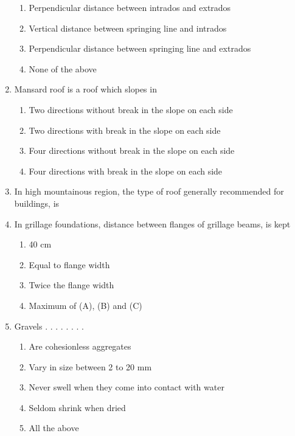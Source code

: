 \documentclass[11pt,a4paper]{article}
\begin{document}
\begin{enumerate}
\begin{enumerate}[label=\Alph*.]
\item{Perpendicular distance between intrados and extrados}
\item{Vertical distance between springing line and intrados}
\item{Perpendicular distance between springing line and extrados}
\item{None of the above}
\end{enumerate}
\item{Mansard roof is a roof which slopes in}
\begin{enumerate}[label=\Alph*.]
\item{Two directions without break in the slope on each side}
\item{Two directions with break in the slope on each side}
\item{Four directions without break in the slope on each side}
\item{Four directions with break in the slope on each side}
\end{enumerate}
\item{In high mountainous region, the type of roof generally recommended for buildings, is}
\\
\item{In grillage foundations, distance between flanges of grillage beams, is kept}
\begin{enumerate}[label=\Alph*.]
\item{40 cm}
\item{Equal to flange width}
\item{Twice the flange width}
\item{Maximum of (A), (B) and (C)}
\end{enumerate}
\item{Gravels . . . . . . . .}
\begin{enumerate}[label=\Alph*.]
\item{Are cohesionless aggregates}
\item{Vary in size between 2 to 20 mm}
\item{Never swell when they come into contact with water}
\item{Seldom shrink when dried}
\item{All the above}

\end{enumerate}
\end{enumerate}
\end{document}
